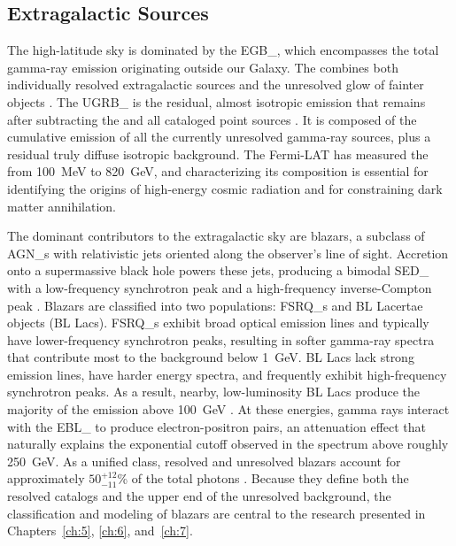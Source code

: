 \subsection{Extragalactic Sources}
\label{sec:extragalactic_sources}

The high-latitude sky is dominated by the \gls{EGB_}, which encompasses the total gamma-ray emission originating outside our Galaxy.
The \EGB combines both individually resolved extragalactic sources and the unresolved glow of fainter objects \cite{DGRB-review,Ajello:2015mfa}.
The \gls{UGRB_} is the residual, almost isotropic emission that remains after subtracting the \GDE and all cataloged point sources \cite{Fermi-LAT:2014ryh,DGRB-review}. It is composed of the cumulative emission of all the currently unresolved gamma-ray sources, plus a residual truly diffuse isotropic background.
The Fermi-LAT has measured the \UGRB from 100~MeV to 820~GeV, and characterizing its composition is essential for identifying the origins of high-energy cosmic radiation and for constraining dark matter annihilation.

The dominant contributors to the extragalactic sky are blazars, a subclass of \glspl{AGN_} with relativistic jets oriented along the observer's line of sight.
Accretion onto a supermassive black hole powers these jets, producing a bimodal \gls{SED_} with a low-frequency synchrotron peak and a high-frequency inverse-Compton peak \cite{DGRB-review}.
Blazars are classified into two populations: \glspl{FSRQ_} and BL Lacertae objects (BL Lacs).
\Glspl{FSRQ_} exhibit broad optical emission lines and typically have lower-frequency synchrotron peaks, resulting in softer gamma-ray spectra that contribute most to the background below 1~GeV.
BL Lacs lack strong emission lines, have harder energy spectra, and frequently exhibit high-frequency synchrotron peaks.
As a result, nearby, low-luminosity BL Lacs produce the majority of the \EGB emission above 100~GeV \cite{Ajello:2015mfa}.
At these energies, gamma rays interact with the \gls{EBL_} to produce electron-positron pairs, an attenuation effect that naturally explains the exponential cutoff observed in the \EGB spectrum above roughly 250~GeV.
As a unified class, resolved and unresolved blazars account for approximately $50^{+12}_{-11}$\% of the total \EGB photons \cite{Ajello:2015mfa}.
Because they define both the resolved catalogs and the upper end of the unresolved background, the classification and modeling of blazars are central to the research presented in Chapters~\ref{ch:5}, \ref{ch:6}, and~\ref{ch:7}.


